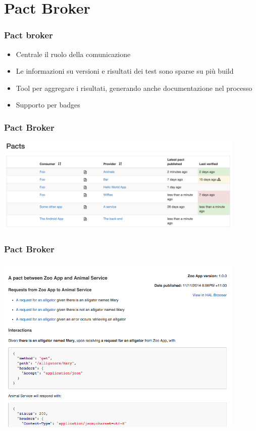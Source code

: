 \documentclass[aspectratio=169]{beamer}
\begin{document}
\section{Pact Broker}
\begin{frame}
\frametitle{Pact broker}
\begin{itemize}
\item Centrale il ruolo della comunicazione
\item Le informazioni su versioni e risultati dei test sono sparse su più build
\item Tool per aggregare i risultati, generando anche documentazione nel processo
\item Supporto per badges

\end{itemize}
\end{frame}
\begin{frame}
\frametitle{Pact Broker}
\center
\includegraphics[width=12cm]{./images/pact-broker-index.png}
\end{frame}
\begin{frame}
\frametitle{Pact Broker}
\center
\includegraphics[width=12cm]{./images/autogenerated_documentation.png}
\end{frame}
\end{document}
